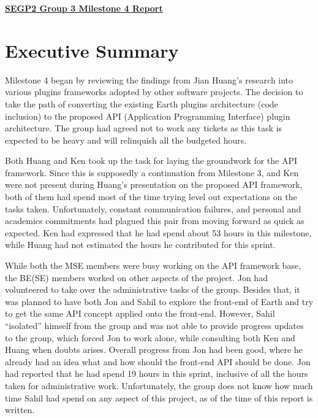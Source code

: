 \documentclass{article}
\begin{document}
\pagestyle{headings}

\begin{center}
{\textbf{\underline{SEGP2 Group 3 Milestone 4 Report}}}
\end{center}


\section*{Executive Summary}

Milestone 4 began by reviewing the findings from Jian Huang's research into various plugins frameworks adopted by other software projects. The decision to take the path of converting the existing Earth plugins architecture (code inclusion) to the proposed API (Application Programming Interface) plugin architecture. The group had agreed not to work any tickets as this task is expected to be heavy and will relinquish all the budgeted hours. 

Both Huang and Ken took up the task for laying the groundwork for the API framework. Since this is supposedly a continuation from Milestone 3, and Ken were not present during Huang's presentation on the proposed API framework, both of them had spend most of the time trying level out expectations on the tasks taken. Unfortunately, constant communication failures, and personal and academics commitments had plagued this pair from moving forward as quick as expected. Ken had expressed that he had spend about 53 hours in this milestone, while Huang had not estimated the hours he contributed for this sprint. 

While both the MSE members were busy working on the API framework base, the BE(SE) members worked on other aspects of the project. Jon had volunteered to take over the administrative tasks of the group. Besides that, it was planned to have both Jon and Sahil to explore the front-end of Earth and try to get the same API concept applied onto the front-end. However, Sahil ``isolated'' himself from the group and was not able to provide progress updates to the group, which forced Jon to work alone, while consulting both Ken and Huang when doubts arises. Overall progress from Jon had been good, where he already had an idea what and how should the front-end API should be done. Jon had reported that he had spend 19 hours in this sprint, inclusive of all the hours taken for administrative work. Unfortunately, the group does not know how much time Sahil had spend on any aspect of this project, as of the time of this report is written. 
\end{document}
